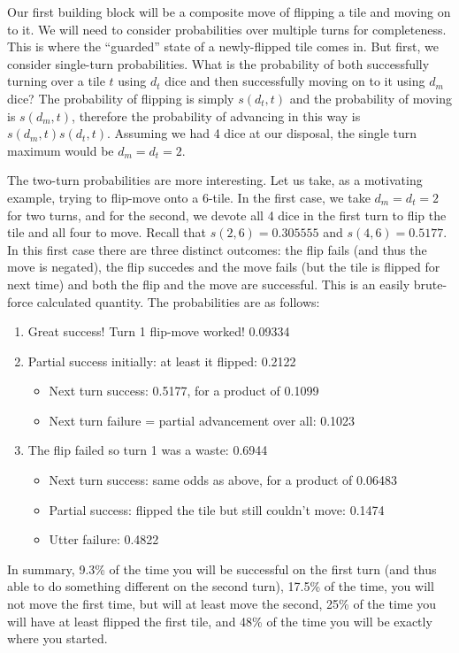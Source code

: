 \documentclass[letterpaper,11pt]{article}
\begin{document}
Our first building block will be a composite move of flipping a tile and
moving on to it.  We will need to consider probabilities over multiple turns
for completeness.  This is where the ``guarded'' state of a newly-flipped tile
comes in.  But first, we consider single-turn probabilities.  What is the
probability of both successfully turning over a tile $t$ using $d_t$ dice and
then successfully moving on to it using $d_m$ dice?  The probability of
flipping is simply $s(d_t,t)$ and the probability of moving is $s(d_m,t)$,
therefore the probability of advancing in this way is $s(d_m,t)s(d_t,t)$.
Assuming we had 4 dice at our disposal, the single turn maximum would be
$d_m=d_t=2$.  

The two-turn probabilities are more interesting.  Let us take,
as a motivating example, trying to flip-move onto a 6-tile.  In the first case,
we take $d_m=d_t=2$ for two turns, and for the second, we devote all 4 dice in
the first turn to flip the tile and all four to move.  Recall that $s(2,6) = 
0.305555$ and $s(4,6)=0.5177$.  In this first case there are three distinct
outcomes: the flip fails (and thus the move is negated), the flip succedes and
the move fails (but the tile is flipped for next time) and both the flip and
the move are successful.  This is an easily brute-force calculated quantity.
The probabilities are as follows:
\begin{enumerate}
\item Great success! Turn 1 flip-move worked! 0.09334
\item Partial success initially: at least it flipped: 0.2122
\begin{itemize}
\item Next turn success: 0.5177, for a product of 0.1099
\item Next turn failure = partial advancement over all: 0.1023
\end{itemize}
\item The flip failed so turn 1 was a waste: 0.6944
\begin{itemize}
\item Next turn success: same odds as above, for a product of 0.06483
\item Partial success: flipped the tile but still couldn't move: 0.1474
\item Utter failure: 0.4822
\end{itemize}
\end{enumerate}
In summary, 9.3\% of the time you will be successful on the first turn (and
thus able to do something different on the second turn), 17.5\% of the time, you
will not move the first time, but will at least move the second, 25\% of the
time you will have at least flipped the first tile, and 48\% of the time you
will be exactly where you started.
\end{document}
